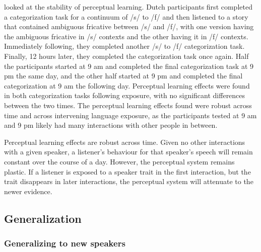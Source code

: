 \citet{Eisner2006} looked at the stability of perceptual learning. 
Dutch participants first completed a categorization task for a continuum of /s/ to /f/ and then listened to a story that contained ambiguous fricative between /s/ and /f/, with one version having the ambiguous fricative in /s/ contexts and the other having it in /f/ contexts.
Immediately following, they completed another /s/ to /f/ categorization task.  
Finally, 12 hours later, they completed the categorization task once again.
Half the participants started at 9 am and completed the final categorization task at 9 pm the same day, and the other half started at 9 pm and completed the final categorization at 9 am the following day.
Perceptual learning effects were found in both categorization tasks following exposure, with no significant differences between the two times. 
 The perceptual learning effects found were robust across time and across intervening language exposure, as the participants tested at 9 am and 9 pm likely had many interactions with other people in between.

Perceptual learning effects are robust across time.  
Given no other interactions with a given speaker, a listener's behaviour for that speaker's speech will remain constant over the course of a day. 
However, the perceptual system remains plastic.  
If a listener is exposed to a speaker trait in the first interaction, but the trait disappears in later interactions, the perceptual system will attenuate to the newer evidence.

\subsection{Generalization}
\label{sec:generalization}

\subsubsection{Generalizing to new speakers}
\label{sec:speakergeneralization}

